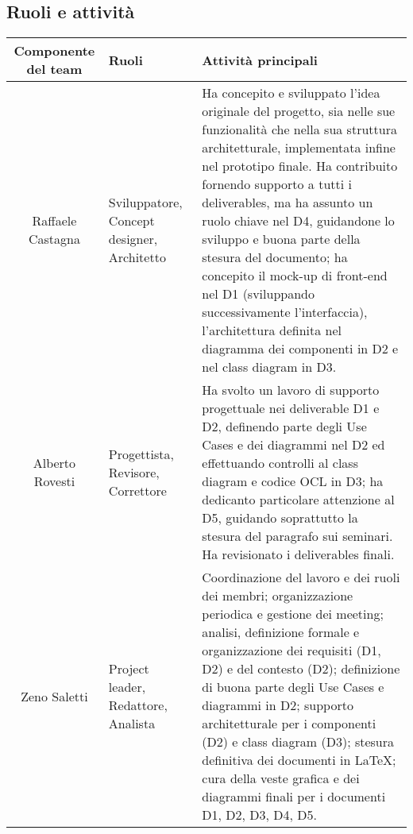 \documentclass[11pt, a4paper]{article}
\theoremstyle{definition}
\begin{document}
\subsection{Ruoli e attività}
\begin{center}
  \footnotesize
  \begin{tabularx}{\textwidth}{|c||X||X|}
      \hline
      \cellcolor{red!70}Componente del team & \cellcolor{red!70}Ruoli & \cellcolor{red!70}Attività principali\\
      \hline
      Raffaele Castagna & Sviluppatore, Concept designer, Architetto& Ha concepito e sviluppato l'idea originale del progetto, sia nelle sue funzionalità che nella sua struttura architetturale, implementata infine nel prototipo finale. Ha contribuito fornendo supporto a tutti i deliverables, ma ha assunto un ruolo chiave nel D4, guidandone lo sviluppo e buona parte della stesura del documento; ha concepito il mock-up di front-end nel D1 (sviluppando successivamente l'interfaccia), l'architettura definita nel diagramma dei componenti in D2 e nel class diagram in D3.\\
      \hline
      Alberto Rovesti & Progettista, Revisore, Correttore & Ha svolto un lavoro di supporto progettuale nei deliverable D1 e D2, definendo parte degli Use Cases e dei diagrammi nel D2 ed effettuando controlli al class diagram e codice OCL in D3; ha dedicanto particolare attenzione al D5, guidando soprattutto la stesura del paragrafo sui seminari. Ha revisionato i deliverables finali.\\
      \hline
      Zeno Saletti & Project leader, Redattore, Analista & Coordinazione del lavoro e dei ruoli dei membri; organizzazione periodica e gestione dei meeting; analisi, definizione formale e organizzazione dei requisiti (D1, D2) e del contesto (D2); definizione di buona parte degli Use Cases e diagrammi in D2; supporto architetturale per i componenti (D2) e class diagram (D3); stesura definitiva dei documenti in \LaTeX; cura della veste grafica e dei diagrammi finali per i documenti D1, D2, D3, D4, D5.\\
      \hline
  \end{tabularx}
\end{center}
\end{document}
